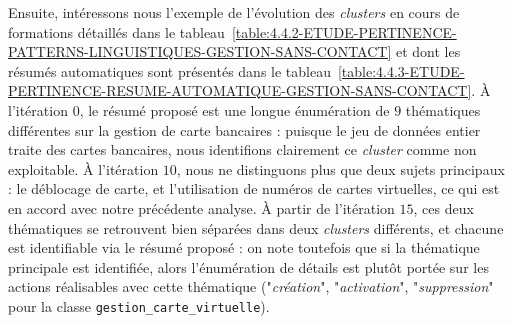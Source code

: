 			Ensuite, intéressons nous l'exemple de l'évolution des \textit{clusters} en cours de formations détaillés dans le tableau~\ref{table:4.4.2-ETUDE-PERTINENCE-PATTERNS-LINGUISTIQUES-GESTION-SANS-CONTACT} et dont les résumés automatiques sont présentés dans le tableau~\ref{table:4.4.3-ETUDE-PERTINENCE-RESUME-AUTOMATIQUE-GESTION-SANS-CONTACT}.
			À l'itération $0$, le résumé proposé est une longue énumération de $9$ thématiques différentes sur la gestion de carte bancaires : puisque le jeu de données entier traite des cartes bancaires, nous identifions clairement ce \textit{cluster} comme non exploitable.
			À l'itération $10$, nous ne distinguons plus que deux sujets principaux : le déblocage de carte, et l'utilisation de numéros de cartes virtuelles, ce qui est en accord avec notre précédente analyse.
			À partir de l'itération $15$, ces deux thématiques se retrouvent bien séparées dans deux \textit{clusters} différents, et chacune est identifiable via le résumé proposé : on note toutefois que si la thématique principale est identifiée, alors l'énumération de détails est plutôt portée sur les actions réalisables avec cette thématique ("\textit{création}", "\textit{activation}", "\textit{suppression}" pour la classe \texttt{gestion\_carte\_virtuelle}).
			
